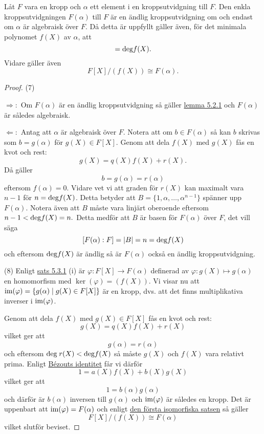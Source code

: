 \documentclass{article}
\newcommand{\grad}[0]{\textnormal{deg}}
\newcommand{\im}[0]{\textnormal{im}}
\theoremstyle{definition}
\begin{document}
\hypertarget{5.3.2}{}
\begin{mytheo}{}{}
  Låt $F$ vara en kropp och $\alpha$ ett element i en kroppsutvidgning till $F$. Den enkla kroppsutvidgningen $F(\alpha)$ till $F$ är en 
  ändlig kroppsutvidgning om och endast om $\alpha$ är algebraisk över $F$. Då detta är uppfyllt gäller även, för det minimala polynomet $f(X)$ av $\alpha$, att
  \begin{equation}
    [F(\alpha) : F] = \grad f(X).
  \end{equation}
  Vidare gäller även 
  \begin{equation}
    F[X]/(f(X)) \cong F(\alpha).
  \end{equation}
\end{mytheo}
\begin{proof}
  (7) 
  
  $\Rightarrow:$ Om $F(\alpha)$ är en ändlig kroppsutvidgning så gäller \hyperlink{algebraiskkropp}{lemma 5.2.1} och $F(\alpha)$ är således algebraisk. 
  
  $\Leftarrow:$ Antag att $\alpha$ är algebraisk över $F$. Notera att om $b \in F(\alpha)$ så kan $b$ skrivas som $b = g(\alpha)$ för $g(X) \in F[X].$
  Genom att dela $f(X)$ med $g(X)$ fås en kvot och rest: 
  \[g(X) = q(X)f(X) + r(X).\]
  Då gäller 
  \[b = g(\alpha) = r(\alpha)\]
  eftersom $f(\alpha) = 0$. Vidare vet vi att graden för $r(X)$ kan maximalt vara $n-1$ för $n = \grad f(X)$. Detta betyder att $B = \{1, \alpha, \ldots, \alpha^{n-1}\}$
  spänner upp $F(\alpha)$. Notera även att $B$ måste vara linjärt oberoende eftersom $n-1 < \grad f(X) = n.$ Detta medför att $B$ är basen för $F(\alpha)$ över $F$, 
  det vill säga 
  \[ [F(\alpha): F] = |B| = n = \grad f(X) \]
  och eftersom $\grad f(X)$ är ändlig så är $F(\alpha)$ också en ändlig kroppsutvidgning. 

  (8) Enligt \hyperlink{minpol}{sats 5.3.1} (i) är $\varphi: F[X] \rightarrow F(\alpha)$ definerad av $\varphi: g(X) \mapsto g(\alpha)$ 
  en homomorfism med $\ker(\varphi) = (f(X)).$ Vi visar nu att $\im(\varphi) = \{g(\alpha) \; | \; g(X) \in F[X]\}$ är en kropp, 
  dvs. att det finns multiplikativa inverser i $\im(\varphi)$. 

  Genom att dela $f(X)$ med $g(X) \in F[X]$ fås en kvot och rest: 
  \[g(X) = q(X)f(X) + r(X)\]
  vilket ger att 
  \[g(\alpha) = r(\alpha)\]
  och eftersom $\grad \; r(X) < \grad f(X)$ så måste $g(X)$ och $f(X)$ vara relativt prima. Enligt \hyperlink{Bezouts identitet}{Bézouts identitet}
  får vi därför 
  \[1 = a(X)f(X) + b(X)g(X)\]
  vilket ger att 
  \[1 = b(\alpha)g(\alpha)\]
  och därför är $b(\alpha)$ inversen till $g(\alpha)$ och $\im(\varphi)$ är således en kropp. Det är uppenbart att $\im(\varphi) = F(\alpha)$
  och enligt \hyperlink{isomorfiska}{den första isomorfiska satsen} så gäller 
  \[F[X]/(f(X)) \cong F(\alpha)\]
  vilket slutför beviset.
\end{proof}
\end{document}
